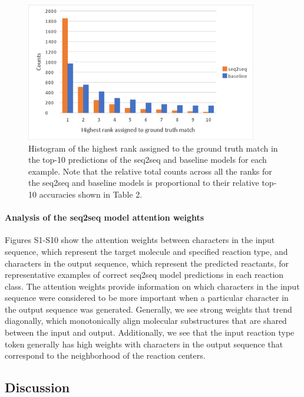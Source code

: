 \begin{figure}
  \centering
  \includegraphics[width=0.9\textwidth]{Images/ret_histograph.png}
  \caption{Histogram of the highest rank assigned to the ground truth match in the top-10 predictions of the seq2seq and baseline models for each example. Note that the relative total counts across all the ranks for the seq2seq and baseline models is proportional to their relative top-10 accuracies shown in Table 2.}
  \label{fig:ret_table2}
\end{figure}

\paragraph{Analysis of the seq2seq model attention weights}

Figures S1-S10 show the attention weights between characters in the input sequence, which represent the target molecule and specified reaction type, and characters in the output sequence, which represent the predicted reactants, for representative examples of correct seq2seq model predictions in each reaction class. The attention weights provide information on which characters in the input sequence were considered to be more important when a particular character in the output sequence was generated. Generally, we see strong weights that trend diagonally, which monotonically align molecular substructures that are shared between the input and output. Additionally, we see that the input reaction type token generally has high weights with characters in the output sequence that correspond to the neighborhood of the reaction centers.

\subsection{Discussion}

